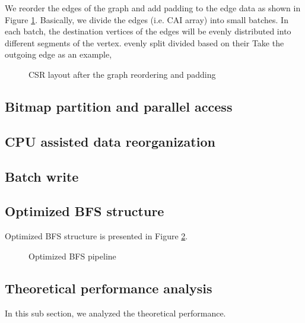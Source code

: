 We reorder the edges of the graph and 
add padding to the edge data as shown in Figure \ref{fig:graph-reorder}. Basically, 
we divide the edges (i.e. CAI array) into small batches. In each batch, the destination 
vertices of the edges will be evenly distributed into different segments of the vertex. 
evenly split 
divided based on their Take the outgoing edge as an example,

\begin{figure}
    \caption{CSR layout after the graph reordering and padding}
\label{fig:graph-reorder}
\end{figure}

\subsection{Bitmap partition and parallel access}
\subsection{CPU assisted data reorganization}
\subsection{Batch write}

\subsection{Optimized BFS structure}
Optimized BFS structure is presented in Figure \ref{fig:opt-bfs}.
\begin{figure}
    \caption{Optimized BFS pipeline}
\label{fig:opt-bfs}
\end{figure}

\subsection{Theoretical performance analysis}
In this sub section, we analyzed the theoretical performance.
